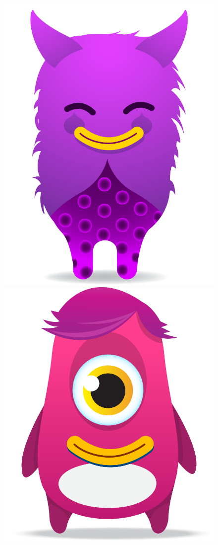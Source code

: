 \documentclass[twoside]{ctuthesis}
\theoremstyle{plain}
\theoremstyle{definition}
\theoremstyle{note}
\begin{document}
\begin{figure}[]
    \includegraphics[width=(0.25\textwidth)]{images/avatars/avatar-magenta.png}
    \hspace{0.1\textwidth}
    \includegraphics[width=(0.25\textwidth)]{images/avatars/avatar-pink.png}
    \label{img:avatars}
\end{figure}
\end{document}
